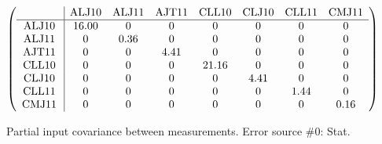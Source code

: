 \begin{table}[H]
\scriptsize
\begin{center}
\renewcommand{\arraystretch}{1.1}
\begin{math}\left(\begin{array}{c|ccccccc}
 & \mathrm{ALJ10} & 
\mathrm{ALJ11} & 
\mathrm{AJT11} & 
\mathrm{CLL10} & 
\mathrm{CLJ10} & 
\mathrm{CLL11} & 
\mathrm{CMJ11} \\
\hline
\mathrm{ALJ10} \hspace*{2pt} &      16.00 &  0 &  0 &  0 &  0 &  0 &  0 \\
\mathrm{ALJ11} \hspace*{2pt} &  0 &       0.36 &  0 &  0 &  0 &  0 &  0 \\
\mathrm{AJT11} \hspace*{2pt} &  0 &  0 &       4.41 &  0 &  0 &  0 &  0 \\
\mathrm{CLL10} \hspace*{2pt} &  0 &  0 &  0 &      21.16 &  0 &  0 &  0 \\
\mathrm{CLJ10} \hspace*{2pt} &  0 &  0 &  0 &  0 &       4.41 &  0 &  0 \\
\mathrm{CLL11} \hspace*{2pt} &  0 &  0 &  0 &  0 &  0 &       1.44 &  0 \\
\mathrm{CMJ11} \hspace*{2pt} &  0 &  0 &  0 &  0 &  0 &  0 &       0.16 \\
\end{array}\right)\end{math}
\caption{Partial input covariance between measurements. Error source \#0: Stat.}
\renewcommand{\arraystretch}{1}
\end{center}
\end{table}
